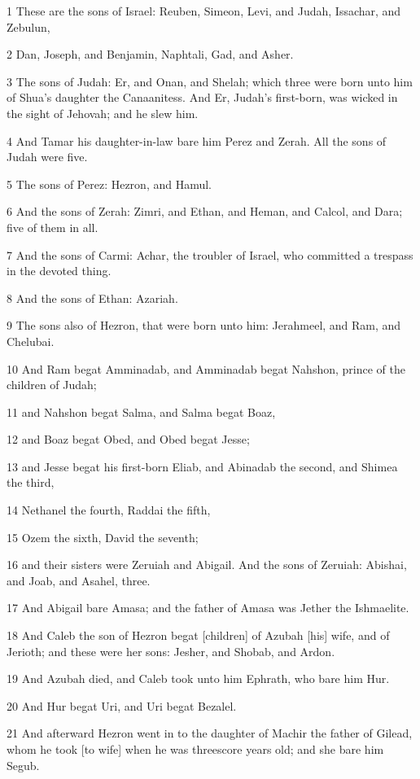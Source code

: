 \par 1 These are the sons of Israel: Reuben, Simeon, Levi, and Judah, Issachar, and Zebulun,
\par 2 Dan, Joseph, and Benjamin, Naphtali, Gad, and Asher.
\par 3 The sons of Judah: Er, and Onan, and Shelah; which three were born unto him of Shua's daughter the Canaanitess. And Er, Judah's first-born, was wicked in the sight of Jehovah; and he slew him.
\par 4 And Tamar his daughter-in-law bare him Perez and Zerah. All the sons of Judah were five.
\par 5 The sons of Perez: Hezron, and Hamul.
\par 6 And the sons of Zerah: Zimri, and Ethan, and Heman, and Calcol, and Dara; five of them in all.
\par 7 And the sons of Carmi: Achar, the troubler of Israel, who committed a trespass in the devoted thing.
\par 8 And the sons of Ethan: Azariah.
\par 9 The sons also of Hezron, that were born unto him: Jerahmeel, and Ram, and Chelubai.
\par 10 And Ram begat Amminadab, and Amminadab begat Nahshon, prince of the children of Judah;
\par 11 and Nahshon begat Salma, and Salma begat Boaz,
\par 12 and Boaz begat Obed, and Obed begat Jesse;
\par 13 and Jesse begat his first-born Eliab, and Abinadab the second, and Shimea the third,
\par 14 Nethanel the fourth, Raddai the fifth,
\par 15 Ozem the sixth, David the seventh;
\par 16 and their sisters were Zeruiah and Abigail. And the sons of Zeruiah: Abishai, and Joab, and Asahel, three.
\par 17 And Abigail bare Amasa; and the father of Amasa was Jether the Ishmaelite.
\par 18 And Caleb the son of Hezron begat [children] of Azubah [his] wife, and of Jerioth; and these were her sons: Jesher, and Shobab, and Ardon.
\par 19 And Azubah died, and Caleb took unto him Ephrath, who bare him Hur.
\par 20 And Hur begat Uri, and Uri begat Bezalel.
\par 21 And afterward Hezron went in to the daughter of Machir the father of Gilead, whom he took [to wife] when he was threescore years old; and she bare him Segub.
